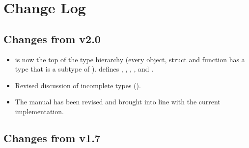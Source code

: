 \documentclass[12pt,twoside,notitlepage]{report}
\begin{document}


 

\clearpage

{\parskip 0pt
\addtolength{\cftsecnumwidth}{0.5em}
\addtolength{\cftsubsecnumwidth}{0.5em}
\addtolength{\cftsubsecindent}{0.5em}
\tableofcontents
}




	







	
	
	
	
	
	


%
%
\renewcommand{\bibname}{References}



%	


\clearpage


\appendix

\chapter{Change Log}

\section{Changes from \Xten{} v2.0}

\begin{itemize}
\item {} is now the top of the type hierarchy (every object,
  struct and function has a type that is a subtype of
  ).  defines , , ,
  ,  and .
\item Revised discussion of incomplete types ().
\item The manual has been revised and brought into line with the current implementation. 
\end{itemize}
\section{Changes from \Xten{} v1.7}
\end{document}
